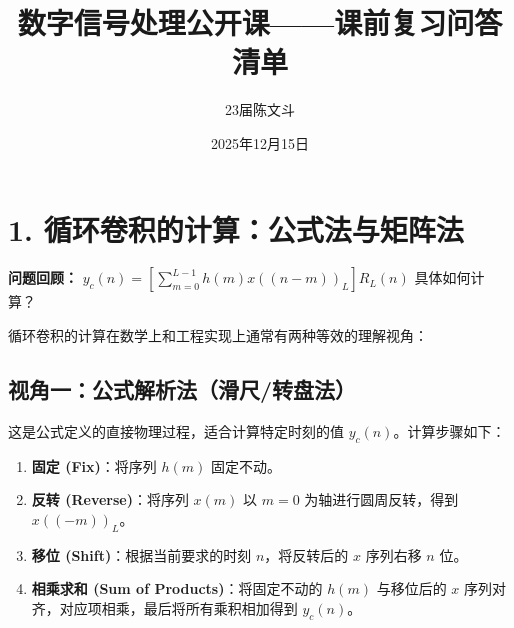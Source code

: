 \documentclass[12pt, a4paper]{article}
\title{\textbf{数字信号处理公开课——课前复习问答清单}}
\author{23届陈文斗}
\date{2025年12月15日}
\begin{document}
	\maketitle
	\thispagestyle{fancy}

	\section*{1. 循环卷积的计算：公式法与矩阵法}

	\textbf{问题回顾：} $y_c(n) = \left[ \sum_{m=0}^{L-1} h(m)x((n-m))_L \right] R_L(n)$ 具体如何计算？

	\begin{tcolorbox}[title=回答要点, breakable]
		循环卷积的计算在数学上和工程实现上通常有两种等效的理解视角：

		\subsection*{视角一：公式解析法（滑尺/转盘法）}
		这是公式定义的直接物理过程，适合计算特定时刻的值 $y_c(n)$。计算步骤如下：
		\begin{enumerate}
			\item \textbf{固定 (Fix)}：将序列 $h(m)$ 固定不动。
			\item \textbf{反转 (Reverse)}：将序列 $x(m)$ 以 $m=0$ 为轴进行圆周反转，得到 $x((-m))_L$。
			\item \textbf{移位 (Shift)}：根据当前要求的时刻 $n$，将反转后的 $x$ 序列右移 $n$ 位。
			\item \textbf{相乘求和 (Sum of Products)}：将固定不动的 $h(m)$ 与移位后的 $x$ 序列对齐，对应项相乘，最后将所有乘积相加得到 $y_c(n)$。
		\end{enumerate}


\end{tcolorbox}
\end{document}
